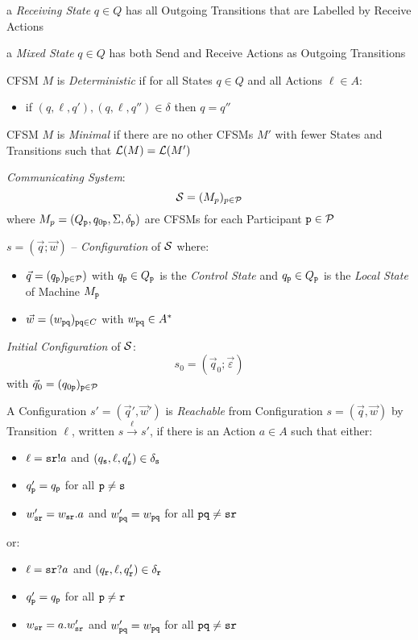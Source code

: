 a \emph{Receiving State} $q \in Q$ has all Outgoing Transitions that are
Labelled by Receive Actions

a \emph{Mixed State} $q \in Q$ has both Send and Receive Actions as
Outgoing Transitions

CFSM $M$ is \emph{Deterministic} if for all States $q \in Q$ and all
Actions $\ell \in A$:
\begin{itemize}
  \item if $(q,\ell,q'),(q,\ell,q'') \in \delta$ then $q = q''$
\end{itemize}

CFSM $M$ is \emph{Minimal} if there are no other CFSMs $M'$ with fewer
States and Transitions such that $\mathcal{L}(M) = \mathcal{L}(M')$

\emph{Communicating System}:
\[
  \mathcal{S} = (M_p)_{p \in \mathcal{P}}
\]
where $M_p = (Q_\mathtt{p}, q_{0\mathtt{p}}, \Sigma, \delta_\mathtt{p})$
are CFSMs for each Participant $\mathtt{p} \in \mathcal{P}$

$s = (\vec{q};\vec{w})$ -- \emph{Configuration} of $\mathcal{S}$
where:
\begin{itemize}
  \item $\vec{q} = (q_\mathtt{p})_{\mathtt{p} \in \mathcal{P}})$ with
    $q_\mathtt{p} \in Q_\mathtt{p}$ is the \emph{Control State} and
    $q_\mathtt{p} \in Q_\mathtt{p}$ is the \emph{Local State} of Machine
    $M_\mathtt{p}$
  \item $\vec{w} = (w_\mathtt{pq})_{\mathtt{pq} \in C}$ with
    $w_\mathtt{pq} \in A^*$
\end{itemize}

\emph{Initial Configuration} of $\mathcal{S}$:
\[
  s_0 = (\vec{q}_0;\vec{\varepsilon})
\]
with $\vec{q}_0 = (q_{0\mathtt{p}})_{\mathtt{p} \in \mathcal{P}}$

A Configuration $s' = (\vec{q}',\vec{w}')$ is \emph{Reachable} from
Configuration $s = (\vec{q},\vec{w})$ by Transition $\ell$, written $s
\xrightarrow{\ell} s'$, if there is an Action $a \in A$ such that
either:
\begin{itemize}
  \item $\ell = \mathtt{sr}!a$ and $(q_\mathtt{s},\ell,q_\mathtt{s}') \in
    \delta_\mathtt{s}$
  \item $q_\mathtt{p}' = q_\mathtt{p}$ for all $\mathtt{p \neq s}$
  \item $w_\mathtt{sr}' = w_\mathtt{sr}.a$ and $w_\mathtt{pq}' =
    w_\mathtt{pq}$ for all $\mathtt{pq \neq sr}$
\end{itemize}
or:
\begin{itemize}
  \item $\ell = \mathtt{sr}?a$ and $(q_\mathtt{r},\ell,q_\mathtt{r}') \in
    \delta_\mathtt{r}$
  \item $q_\mathtt{p}' = q_\mathtt{p}$ for all $\mathtt{p \neq r}$
  \item $w_\mathtt{sr} = a.w_\mathtt{sr}'$ and $w_\mathtt{pq}' =
    w_\mathtt{pq}$ for all $\mathtt{pq \neq sr}$
\end{itemize}

